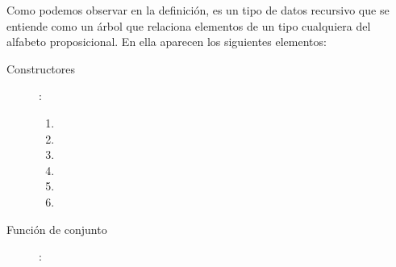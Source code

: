\begin{isabellebody}
\begin{isamarkuptext}%
Como podemos observar en la definición,  es un tipo de datos recursivo que se 
entiende como un árbol que relaciona elementos de un tipo  cualquiera del alfabeto 
proposicional. En ella aparecen los siguientes elementos:
\begin{description}
\item[Constructores]:  
  \begin{enumerate} 
  \item {}  
  \item {}
  \item {}
  \item {}
  \item {}
  \item {}
  \end{enumerate}
\item[Función de conjunto]: 
\end{description}


\end{isamarkuptext}
\end{isabellebody}
